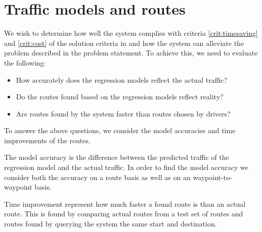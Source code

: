 \section{Traffic models and routes}
We wish to determine how well the system complies with criteria \ref{crit:timesaving} and \ref{crit:cost} of the solution criteria in  and how the system can alleviate the problem described in the problem statement. To achieve this, we need to evaluate the following:
\begin{itemize}
\item How accurately does the regression models reflect the actual traffic?
\item Do the routes found based on the regression models reflect reality?
\item Are routes found by the system faster than routes chosen by drivers?
\end{itemize}
To answer the above questions, we consider the model accuracies and time improvements of the routes. 

The model accuracy is the difference between the predicted traffic of the regression model and the actual traffic. In order to find the model accuracy we consider both the accuracy on a route basis as well as on an waypoint-to-waypoint basis.

Time improvement represent how much faster a found route is than an actual route. This is found by comparing actual routes from a test set of routes and routes found by querying the system the same start and destination.

